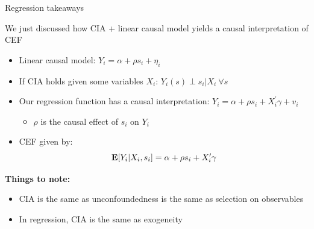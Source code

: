 \documentclass[compress, 8pt]{beamer}
\begin{document}
\begin{frame}{Regression takeaways}

We just discussed how CIA + linear causal model yields a causal interpretation of CEF
\begin{itemize}
    \item Linear causal model: $Y_i = \alpha + \rho s_i + \eta_i$
    \item If CIA holds given some variables $X_i$: $Y_i(s) \perp s_i \vert X_i \ \forall s$
    \item Our regression function has a causal interpretation: $Y_i = \alpha + \rho s_i + X_i^\prime \gamma + v_i$
    \begin{itemize}
        \item $\rho$ is the causal effect of $s_i$ on $Y_i$
    \end{itemize}
    \item CEF given by:
    \begin{equation*}
        \mathbf{E} [Y_i \vert X_i, s_i] = \alpha + \rho s_i + X_i^\prime \gamma
    \end{equation*}
\end{itemize}

\vspace{3ex}
\textbf{Things to note:}
\begin{itemize}
    \item CIA is the same as unconfoundedness is the same as selection on observables
    \item In regression, CIA is the same as exogeneity
\end{itemize}

\end{frame}
\end{document}
